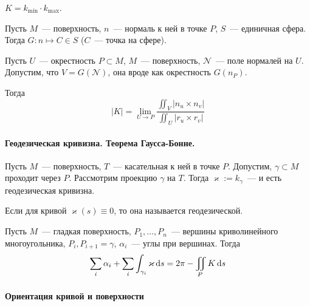 \documentclass[draft,timbord]{longnotes}
\begin{document}
\begin{defn}\label{defn:meas::gauss::crvf}
  $K = k_{\min} \cdot k_{\max}$.
\end{defn}

\begin{defn}\label{defn:meas::gauss::map}
  Пусть $M$~--- поверхность, $n$~--- нормаль к ней в точке $P$, $S$~--- единичная сфера.
  Тогда $G: n \mapsto C \in S$ ($C$~--- точка на сфере).
\end{defn}

\begin{thrm}\label{thrm:meas::gauss::lim}
  Пусть $U$~--- окрестность $P \subset M$, $M$~--- поверхность, $\mathcal N$~--- поле нормалей
  на $U$. Допустим, что $V = G(\mathcal N)$, она вроде как окрестность $G(n_P)$. 

  Тогда \[
    |K| = \lim_{U \to P} \frac{\iint_V |n_u \times n_v|}{\iint_U|r_u \times r_v|} 
  \]
\end{thrm}

\paragraph{Геодезическая кривизна. Теорема Гаусса-Бонне.}
\label{par:dg::bonnet}

\begin{defn}\label{defn:dg::bonnet::geodcrvn}
  Пусть $M$~--- поверхность, $T$~--- касательная к ней в точке $P$. Допустим,
  $\gamma \subset M$ проходит через $P$. Рассмотрим проекцию $\gamma$ на $T$.
  Тогда $\varkappa := k_\gamma $~--- и есть геодезическая кривизна.
\end{defn}

\begin{defn}\label{defn:dg::bonnet::geodcurv}
  Если для кривой $\varkappa(s) \equiv 0$, то она называется геодезической.
\end{defn}

\begin{thrm}\label{thrm:dg::bonnet}
  Пусть $M$~--- гладкая поверхность, $P_1, \dotsc, P_n$~--- вершины криволинейного многоугольника,
  $P_i, P_{i+1} = \gamma $, $\alpha_i$~--- углы при вершинах. Тогда \[
    \sum_i \alpha_i + \sum_i \int _{\gamma_i} \varkappa \, \mathrm{d} s  = 2 \pi - \iint_P K \, \mathrm{d} s
  \]
\end{thrm}





\paragraph{Ориентация кривой и поверхности}
\label{par:dg::orient}
\end{document}
